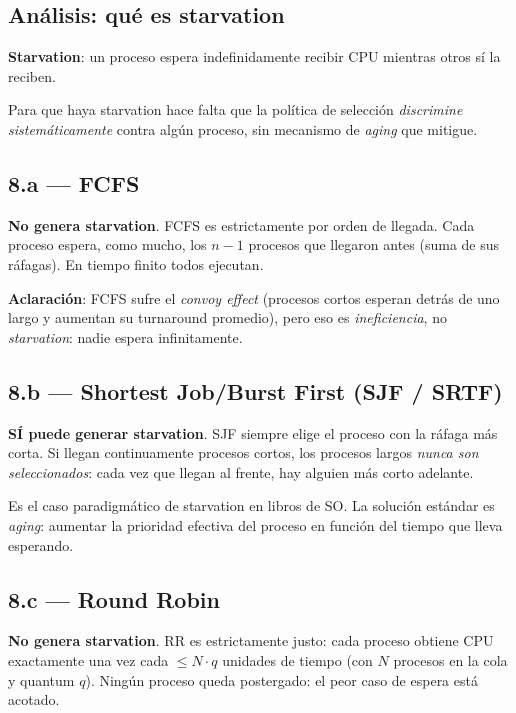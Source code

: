 \documentclass[11pt,a4paper]{article}
\begin{document}
\subsection*{Análisis: qué es starvation}

\textbf{Starvation}: un proceso espera indefinidamente recibir CPU
mientras otros sí la reciben.

Para que haya starvation hace falta que la política de selección
\emph{discrimine sistemáticamente} contra algún proceso, sin
mecanismo de \emph{aging} que mitigue.

\subsection*{8.a --- FCFS}

\begin{respuesta}
\textbf{No genera starvation}. FCFS es estrictamente por orden de
llegada. Cada proceso espera, como mucho, los $n - 1$ procesos que
llegaron antes (suma de sus ráfagas). En tiempo finito todos ejecutan.

\textbf{Aclaración}: FCFS sufre el \emph{convoy effect} (procesos
cortos esperan detrás de uno largo y aumentan su turnaround
promedio), pero eso es \emph{ineficiencia}, no \emph{starvation}:
nadie espera infinitamente.
\end{respuesta}

\subsection*{8.b --- Shortest Job/Burst First (SJF / SRTF)}

\begin{respuesta}
\textbf{SÍ puede generar starvation}. SJF siempre elige el proceso
con la ráfaga más corta. Si llegan continuamente procesos cortos,
los procesos largos \emph{nunca son seleccionados}: cada vez que
llegan al frente, hay alguien más corto adelante.

Es el caso paradigmático de starvation en libros de SO. La solución
estándar es \emph{aging}: aumentar la prioridad efectiva del proceso
en función del tiempo que lleva esperando.
\end{respuesta}

\subsection*{8.c --- Round Robin}

\begin{respuesta}
\textbf{No genera starvation}. RR es estrictamente justo: cada
proceso obtiene CPU exactamente una vez cada $\leq N \cdot q$
unidades de tiempo (con $N$ procesos en la cola y quantum $q$).
Ningún proceso queda postergado: el peor caso de espera está
acotado.
\end{respuesta}
\end{document}
